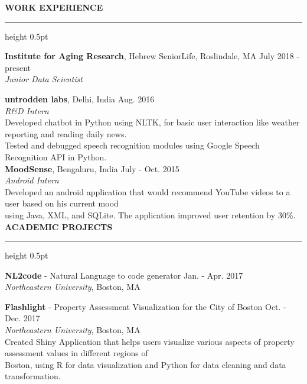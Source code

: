 \documentclass[a4paper]{article}
\newcommand{\myline}{\par
  \kern2pt %
  \hrule height 0.5pt
  \kern2pt %
}
\newcommand{\mybullet}{
	\indent \textbullet \hspace*{2mm}
}
\begin{document}
	\smallskip
	\smallskip
	\noindent
	{\large \textbf{WORK EXPERIENCE}}
	\myline 
	\smallskip
	
  \noindent
  \textbf{Institute for Aging Research}, Hebrew SeniorLife, Roslindale, MA 
  \hfill July 2018 - present\\
        \textit{Junior Data Scientist}\\
        \mybullet %

	\noindent
	\textbf{untrodden labs}, Delhi, India \hfill Aug. 2016 \\
        \textit{R\&D Intern}\\
        \mybullet Developed chatbot in Python using NLTK, for basic user interaction like 
        weather reporting and reading daily news. \\
	\mybullet Tested and debugged speech recognition modules using Google Speech 
        Recognition API in Python. \\
	
	\noindent
	\textbf{MoodSense}, Bengaluru, India \hfill July - Oct. 2015 \\
	\textit{Android Intern} \\
	\mybullet Developed an android application that would recommend YouTube videos to a 
        user based on his current mood \\
        \hspace*{9mm} using Java, XML, and SQLite. The 
        application improved user retention by 30\%. \\ 
	
        \noindent
	{\large \textbf{ACADEMIC PROJECTS}}
	\myline 
	\smallskip


        \noindent
        \textbf{NL2code} - Natural Language to code generator
        \hfill Jan. - Apr. 2017 \\
        \textit{Northeastern University}, Boston, MA \\
        \mybullet %

        \noindent
        \textbf{Flashlight} - Property Assessment Visualization for the City of Boston 
        \hfill Oct. - Dec. 2017 \\
        \textit{Northeastern University}, Boston, MA \\
        \mybullet Created Shiny Application that helps users visualize various aspects of 
        property assessment values in different regions of \\ \hspace*{9mm} Boston, using 
        R for data visualization and Python for data cleaning and data transformation. \\
        
\end{document}
